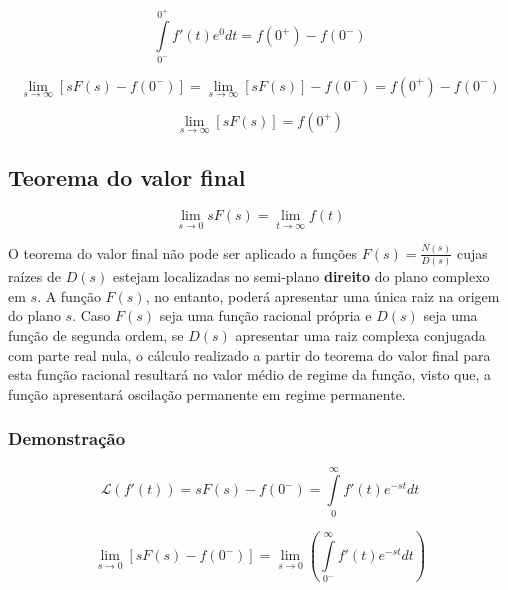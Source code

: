\documentclass[12pt,fleqn]{book} %
\begin{document}
\begin{equation}
\int\limits_{0^-}^{0^+}f'(t)e^{0}dt = f(0^+)-f(0^-)
\end{equation}

\begin{equation}
\lim_{s\rightarrow\infty}[sF(s)-f(0^-)] = \lim_{s\rightarrow\infty}[sF(s)]-f(0^-) = f(0^+)-f(0^-)
\end{equation}

\begin{equation}
\lim_{s\rightarrow\infty}[sF(s)] = f(0^+)
\end{equation}
        
\subsection{Teorema do valor final}        
        \begin{theorem}
        \begin{equation}
        \lim_{s\rightarrow0}sF(s) = \lim_{t\rightarrow\infty}f(t)
        \end{equation}
        \end{theorem}
        
O teorema do valor final não pode ser aplicado a funções $F(s)=\frac{N(s)}{D(s)}$ cujas raízes de $D(s)$ estejam localizadas no semi-plano \textbf{direito} do plano complexo em $s$. A função $F(s)$, no entanto, poderá apresentar uma única raiz na origem do plano $s$. Caso $F(s)$ seja uma função racional própria e $D(s)$ seja uma função de segunda ordem, se $D(s)$ apresentar uma raiz complexa conjugada com parte real nula, o cálculo realizado a partir do teorema do valor final para esta função racional resultará no valor médio de regime da função, visto que, a função apresentará oscilação permanente em regime permanente.

\subsubsection{Demonstração}

        \begin{equation}
        \mathscr{L}(f'(t)) = sF(s)-f(0^-) = \int\limits_{0}^{\infty}f'(t)e^{-st}dt
        \end{equation}
        
        \begin{equation}
        \lim_{s\rightarrow0}[sF(s)-f(0^-)] = \lim_{s\rightarrow0}(\int\limits_{0^-}^{\infty}f'(t)e^{-st}dt)
        \end{equation}
        
\end{document}
